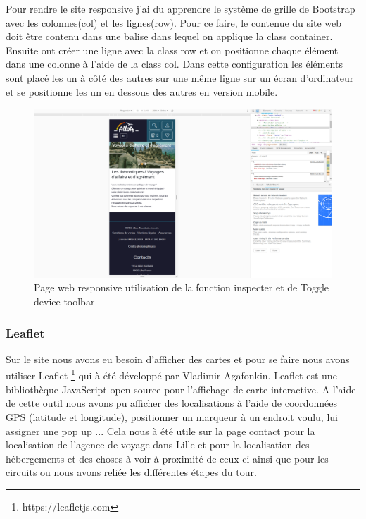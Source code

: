 \documentclass[12pt,a4paper]{report}
\begin{document}
Pour rendre le site responsive j'ai du apprendre le système de grille de Bootstrap avec les colonnes(col) et les lignes(row). Pour ce faire, le contenue du site web doit être contenu dans une balise dans lequel on applique la class container. Ensuite ont créer une ligne avec la class row et on positionne chaque élément dans une colonne à l'aide de la class col. Dans cette configuration les éléments sont placé les un à côté des autres sur une même ligne sur un écran d'ordinateur et se positionne les un en dessous des autres en version mobile.\\

\begin{figure}[h]
\centerline{\includegraphics[scale=0.3]{responsive.png}}
\caption{Page web responsive utilisation de la fonction inspecter et de Toggle device toolbar}
\label{image_hyooper}
\end{figure}


\newpage
\subsubsection{Leaflet}

Sur le site nous avons eu besoin d'afficher des cartes et pour se faire nous avons utiliser Leaflet \footnote{https://leafletjs.com} qui à été développé par Vladimir Agafonkin.  Leaflet est une bibliothèque JavaScript open-source pour l'affichage de carte interactive. A l'aide de cette outil nous avons pu afficher des localisations à l'aide de coordonnées GPS (latitude et longitude), positionner un marqueur à un endroit voulu, lui assigner une pop up ...
Cela nous à été utile sur la page contact pour la localisation de l'agence de voyage dans Lille et pour la localisation des hébergements et des choses à voir à proximité de ceux-ci ainsi que pour les circuits ou nous avons reliée les différentes étapes du tour.\\
\end{document}

